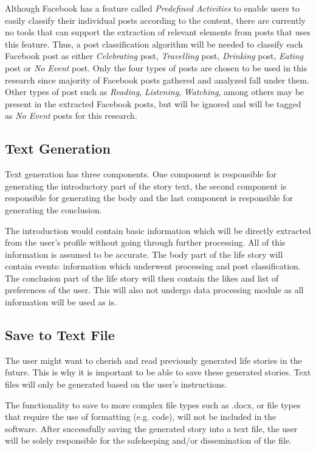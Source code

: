 Although Facebook has a feature called \textit{Predefined Activities} to enable users to easily  classify their individual posts according to the content, there are currently no tools that can support the extraction of relevant elements from posts that uses this feature. Thus, a post classification algorithm will be needed to classify each Facebook post as either \textit{Celebrating} post, \textit{Travelling} post, \textit{Drinking} post, \textit{Eating} post or \textit{No Event} post. Only the four types of posts are chosen to be used in this research since majority of Facebook posts gathered and analyzed fall under them. Other types of post such as \textit{Reading}, \textit{Listening}, \textit{Watching}, among others may be present in the extracted Facebook posts, but will be ignored and will be tagged as \textit{No Event} posts for this research.

\subsection{Text Generation}
Text generation has three components. One component is responsible for generating the introductory part of the story text, the second component is responsible for generating the body and the last component is responsible for generating the conclusion.

The introduction would contain basic information which will be directly extracted from the user’s profile without going through further processing. All of this information is assumed to be accurate. The body part of the life story will contain events: information which underwent processing and post classification. The conclusion part of the life story will then contain the likes and list of preferences of the user. This will also not undergo data processing module as all information will be used as is.

\subsection{Save to Text File}
The user might want to cherish and read previously generated life stories in the future. This is why it is important to be able to save these generated stories. Text files will only be generated based on the user's instructions. 

The functionality to save to more complex file types such as .docx, or file types that require the use of formatting (e.g. code), will not be included in the software. After successfully saving the generated story into a text file, the user will be solely responsible for the safekeeping and/or dissemination of the file.

